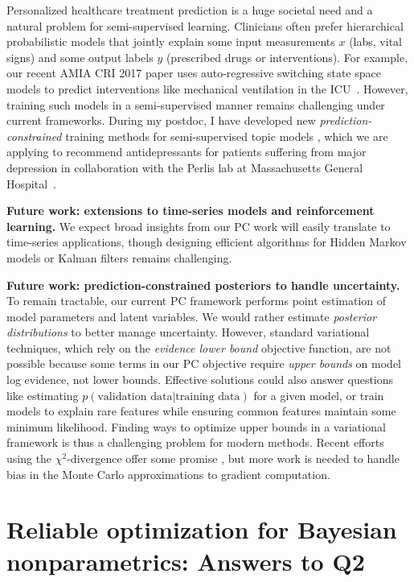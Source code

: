 \documentclass[11pt,letterpaper]{article}
\begin{document}
Personalized healthcare treatment prediction is a huge societal need and a natural problem for semi-supervised learning. 
Clinicians often prefer hierarchical probabilistic models that jointly explain some input measurements $x$ (labs, vital signs) and some output labels $y$ (prescribed drugs or interventions).
For example, our recent AMIA CRI 2017 paper uses auto-regressive switching state space models to predict interventions like mechanical ventilation in the ICU~\citep{ghassemi2017ssam}. However, training such models in a semi-supervised manner remains challenging under current frameworks. During my postdoc, I have developed new \emph{prediction-constrained} training methods for semi-supervised topic models \citep{hughes2017pc}, 
which we are applying to recommend antidepressants for patients suffering from major depression in collaboration with the Perlis lab at Massachusetts General Hospital~\citep{hughes2016clinicalSLDA}.


\textbf{Future work: extensions to time-series models and reinforcement learning.}
We expect broad insights from our PC work will easily translate to time-series applications, though designing efficient algorithms for Hidden Markov models or Kalman filters remains challenging.


\textbf{Future work: prediction-constrained posteriors to handle uncertainty.}
To remain tractable, our current PC framework performs point estimation of model parameters and latent variables. We would rather estimate \emph{posterior distributions} to better manage uncertainty. However, standard variational techniques, which rely on the \emph{evidence lower bound} objective function, are not possible because some terms in our PC objective require \emph{upper bounds} on model log evidence, not lower bounds. Effective solutions could also answer questions like estimating $p(\text{validation data} | \text{training data})$ for a given model, or train models to explain rare features while ensuring common features maintain some minimum likelihood.
Finding ways to optimize upper bounds in a variational framework is thus a challenging problem for modern methods.
Recent efforts using the $\chi^2$-divergence offer some promise \citep{chisq}, but more work is needed to handle bias in the Monte Carlo approximations to gradient computation.


\section{Reliable optimization for Bayesian nonparametrics: Answers to Q2}
\end{document}
